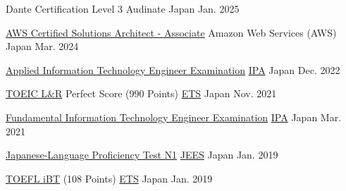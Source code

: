 
\begin{cvhonors}

  \cvhonor
  {Dante Certification Level 3} %
  {Audinate} %
  {Japan} %
  {Jan. 2025} %

  \cvhonor
  {\href{https://www.credly.com/badges/84c825b1-44c9-448f-9269-f0cb9fd1e15e/public_url}{AWS Certified Solutions Architect - Associate}} %
  {Amazon Web Services (AWS)} %
  {Japan} %
  {Mar. 2024} %


  \cvhonor
    {\href{https://www.ipa.go.jp/shiken/kubun/ap.html}{Applied Information Technology Engineer Examination}} %
    {\href{https://www.ipa.go.jp/index.html}{IPA}} %
    {Japan} %
    {Dec. 2022} %

  \cvhonor
    {\href{https://www.iibc-global.org/toeic.html}{TOEIC L\&R} Perfect Score (990 Points)} %
    {\href{https://www.ets.org/}{ETS}} %
    {Japan} %
    {Nov. 2021} %

  \cvhonor
    {\href{https://www.ipa.go.jp/shiken/kubun/fe.html}{Fundamental Information Technology Engineer Examination}} %
    {\href{https://www.ipa.go.jp/index.html}{IPA}} %
    {Japan} %
    {Mar. 2021} %

  \cvhonor
    {\href{https://www.jlpt.jp/}{Japanese-Language Proficiency Test N1}} %
    {\href{http://www.jees.or.jp/}{JEES}} %
    {Japan} %
    {Jan. 2019} %

  \cvhonor
    {\href{https://www.ets.org/toefl.html}{TOEFL iBT} (108 Points)} %
    {\href{https://www.ets.org/}{ETS}} %
    {Japan} %
    {Jan. 2019} %
\end{cvhonors}
